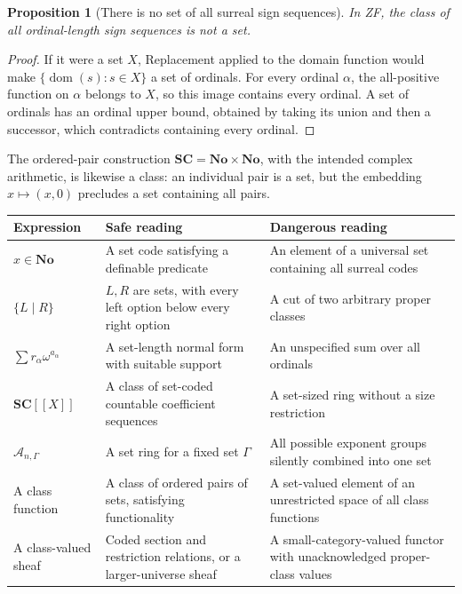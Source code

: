 \documentclass[11pt,letterpaper]{article}
\newtheorem{proposition}[theorem]{Proposition}
\theoremstyle{definition}
\theoremstyle{remark}
\newcommand{\No}{\mathbf{No}}
\newcommand{\SC}{\mathbf{SC}}
\newcommand{\A}{\mathscr A}
\numberwithin{equation}{section}
\begin{document}
\begin{proposition}[There is no set of all surreal sign sequences]\label{prop:proper}
In ZF, the class of all ordinal-length sign sequences is not a set.
\end{proposition}
\begin{proof}
If it were a set \(X\), Replacement applied to the domain function would make
\(\{\operatorname{dom}(s):s\in X\}\) a set of ordinals. For every ordinal \(\alpha\), the all-positive function on \(\alpha\) belongs to \(X\), so this image contains every ordinal. A set of ordinals has an ordinal upper bound, obtained by taking its union and then a successor, which contradicts containing every ordinal.
\end{proof}

The ordered-pair construction \(\SC=\No\times\No\), with the intended complex arithmetic, is likewise a class: an individual pair is a set, but the embedding \(x\mapsto(x,0)\) precludes a set containing all pairs.

\begin{longtable}{@{}L{0.25\textwidth}L{0.31\textwidth}L{0.36\textwidth}@{}}
\toprule
Expression & Safe reading & Dangerous reading\\
\midrule\endhead
\(x\in\No\) & A set code satisfying a definable predicate & An element of a universal set containing all surreal codes\\[0.4em]
\(\{L\mid R\}\) & \(L,R\) are sets, with every left option below every right option & A cut of two arbitrary proper classes\\[0.4em]
\(\sum r_\alpha\omega^{a_\alpha}\) & A set-length normal form with suitable support & An unspecified sum over all ordinals\\[0.4em]
\(\SC[[X]]\) & A class of set-coded countable coefficient sequences & A set-sized ring without a size restriction\\[0.4em]
\(\A_{n,\Gamma}\) & A set ring for a fixed set \(\Gamma\) & All possible exponent groups silently combined into one set\\[0.4em]
A class function & A class of ordered pairs of sets, satisfying functionality & A set-valued element of an unrestricted space of all class functions\\[0.4em]
A class-valued sheaf & Coded section and restriction relations, or a larger-universe sheaf & A small-category-valued functor with unacknowledged proper-class values\\
\bottomrule
\end{longtable}
\end{document}
